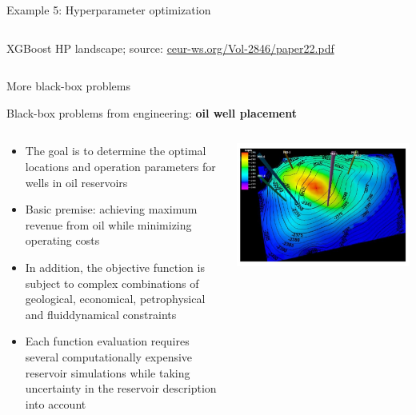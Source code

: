 \documentclass[11pt,compress,t,notes=noshow, xcolor=table]{beamer}
\begin{document}
\begin{vbframe}{Example 5: Hyperparameter optimization}
\begin{columns}
\begin{column}{0.35\textwidth}
\begin{center}
\begin{tiny}{XGBoost HP landscape; source: \url{ceur-ws.org/Vol-2846/paper22.pdf}}\end{tiny}
		\end{center}
  \end{column}
\end{columns}
\end{vbframe}



\begin{vbframe}{More black-box problems}

Black-box problems from engineering: \textbf{oil well placement}
\vspace*{-0.1cm}
\begin{columns}
	\begin{column}{0.65\textwidth}
		\begin{itemize}
			\item The goal is to determine the optimal locations and operation parameters for wells in oil reservoirs
			\item Basic premise: achieving maximum revenue from oil while minimizing operating costs
			\item In addition, the objective function is subject to complex combinations of geological, economical, petrophysical and fluiddynamical constraints 
			\item Each function evaluation requires several computationally expensive reservoir simulations while taking uncertainty in the reservoir description into account 
		\end{itemize}
	\end{column}
	\begin{column}{0.35\textwidth}
		\begin{center}
			\includegraphics{figure_man/oil_well_problem.jpg}

\end{center}
\end{column}
\end{columns}
\end{vbframe}
\end{document}
